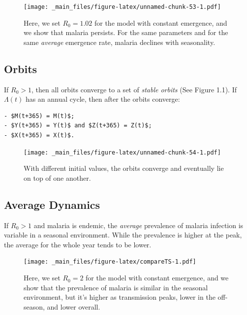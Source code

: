 \documentclass[
]{book}
\begin{document}
\begin{figure}
\centering
\texttt{[image: \_main\_files/figure-latex/unnamed-chunk-53-1.pdf]}
\caption{\label{fig:unnamed-chunk-53}Here, we set \(R_0= 1.02\) for the model with constant emergence, and we show that malaria persists. For the same parameters and for the same \emph{average} emergence rate, malaria declines with seasonality.}
\end{figure}

\clearpage

\subsection{Orbits}\label{orbits}

If \(R_0 >1\), then all orbits converge to a set of \emph{stable orbits} (See Figure 1.1). If \(\Lambda(t)\) has an annual cycle, then after the orbits converge:

\begin{verbatim}
- $M(t+365) = M(t)$; 
- $Y(t+365) = Y(t)$ and $Z(t+365) = Z(t)$; 
- $X(t+365) = X(t)$. 
\end{verbatim}

\begin{figure}
\centering
\texttt{[image: \_main\_files/figure-latex/unnamed-chunk-54-1.pdf]}
\caption{\label{fig:unnamed-chunk-54}With different initial values, the orbits converge and eventually lie on top of one another.}
\end{figure}

\clearpage

\subsection{Average Dynamics}\label{average-dynamics}

If \(R_0>1\) and malaria is endemic, the \emph{average} prevalence of malaria infection is variable in a seasonal environment. While the prevalence is higher at the peak, the average for the whole year tends to be lower.

\begin{figure}
\centering
\texttt{[image: \_main\_files/figure-latex/compareTS-1.pdf]}
\caption{\label{fig:compareTS}Here, we set \(R_0= 2\) for the model with constant emergence, and we show that the prevalence of malaria is similar in the seasonal environment, but it's higher as transmission peaks, lower in the off-season, and lower overall.}
\end{figure}
\end{document}
